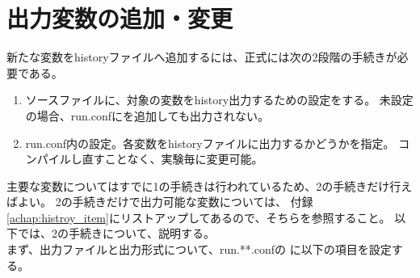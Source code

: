 \section{出力変数の追加・変更} \label{sec:output}
新たな変数をhistoryファイルへ追加するには、正式には次の2段階の手続きが必要である。

\begin{enumerate}
\item ソースファイルに、対象の変数をhistory出力するための設定をする。
未設定の場合、run.confにを追加しても出力されない。
\item run.conf内の設定。各変数をhistoryファイルに出力するかどうかを指定。
コンパイルし直すことなく、実験毎に変更可能。
\end{enumerate}
主要な変数についてはすでに1の手続きは行われているため、2の手続きだけ行えばよい。
2の手続きだけで出力可能な変数については、
付録\ref{achap:histroy_item}にリストアップしてあるので、そちらを参照すること。
以下では、2の手続きについて、説明する。\\

まず、出力ファイルと出力形式について、run.**.confの
に以下の項目を設定する。\\

\\

